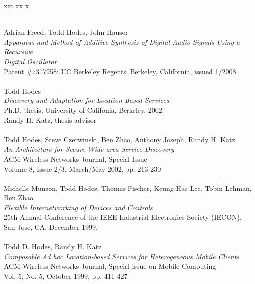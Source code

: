 \begin{tabbing}
xxi \= xx \= x \= \kill

\smallskip \\[-3pt]
\>    Adrian Freed, Todd Hodes, John Hauser \\
\>\>      {\it Apparatus and Method of Additive Synthesis of Digital Audio Signals Using  a Recursive} \\
\>\>      {\it  Digital Oscillator} \\
\>\>    Patent \#7317958: UC Berkeley Regents, Berkeley, California, issued 1/2008. \\

\smallskip \\[-3pt]
\>    Todd Hodes \\
\>\>      {\it Discovery and Adaptation for Location-Based Services} \\
\>\>    Ph.D. thesis, University of Califonia, Berkeley. 2002. \\
\>\>    Randy H. Katz, thesis advisor \\

\smallskip \\[-3pt]
\>    Todd Hodes, Steve Czerwinski, Ben Zhao, Anthony Joseph, Randy H. Katz \\
\>\>      {\it An Architecture for Secure Wide-area Service Discovery} \\
\>\>       ACM Wireless Networks Journal, Special Issue \\
\>\>       Volume 8, Issue 2/3, March/May 2002, pp. 213-230 \\

\smallskip \\[-3pt]
\>   Michelle Munson, Todd Hodes, Thomas Fischer, Keung Hae Lee, Tobin Lehman, Ben Zhao \\
\>\>      {\it Flexible Internetworking of Devices and Controls} \\
\>\>        25th Annual Conference of the IEEE Industrial Electronics Society (IECON),  \\
\>\>	    San Jose, CA, December 1999. \\

\smallskip \\[-3pt]
\>    Todd D. Hodes, Randy H. Katz \\
\>\>      {\it Composable Ad hoc Location-based Services for Heterogeneous
             Mobile Clients} \\
\>\>       ACM Wireless Networks Journal, Special issue on Mobile Computing \\
\>\>       Vol. 5, No. 5, October 1999, pp. 411-427. \\



\end{tabbing}
